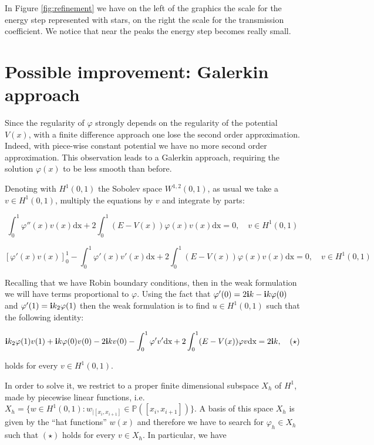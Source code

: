 \documentclass[12pt,a4paper,onecolumn]{article}
\theoremstyle{definition}
\theoremstyle{plain}
\newcommand{\var}{\varphi}
\begin{document}
In Figure \ref {fig:refinement} we have on the left of the graphics the scale for the energy step represented with stars, on the right the scale for the transmission coefficient. We notice that near the peaks the energy step becomes really small.




\section{Possible improvement:  Galerkin approach}


Since the regularity of $\var$ strongly depends on the regularity of the potential $V(x)$, with a finite difference approach one lose the second order approximation. Indeed, with piece-wise constant potential we have no more second order approximation. This observation leads to a Galerkin approach, requiring the solution $\var(x)$ to be less smooth than before. 

Denoting with $H^1(0,1)$ the Sobolev space $W^{1,2}(0,1)$, as usual we take a $v \in H^1(0,1)$, multiply the equations by $v$ and integrate by parts:


\[
\int_{0}^{1} \var ''(x) v(x)  \text{dx} + 2 \int_0^1 (E-V(x))\var (x) v(x) \text{dx} =0, \quad v \in H^1(0,1)
\]



\[
[\var '(x) v(x)]_{0}^{1} - \int_{0}^{1} \var '(x) v'(x)  \text{dx}+ 2 \int_0^1 (E-V(x))\var (x) v(x) \text{dx} =0, \quad v \in H^1(0,1)
\]

Recalling that we have Robin boundary conditions, then in the weak formulation we will have terms proportional to $\var $. Using the fact that $\var'(0)=2 \bold{i} k - \bold{i} k \var(0)$ and $\var'(1)=\bold{i}k_2 \var(1)$ then the weak formulation is to find $u \in H^1(0,1)$ such that the following identity:

\[ 
\bold{i} k_2 \var(1)v(1) + \bold{i} k \var(0) v(0) -2 \bold{i}k v(0) - \int_0^1 \var' v' \text{dx} + 2 \int_0^1(E-V(x)) \var v \text{dx} = 2 \bold{i}k, 	\quad (\star)
\]

holds for every $v \in H^1(0,1)$.

In order to solve it, we restrict to a proper finite dimensional subspace $X_h$ of $H^1$, made by piecewise linear functions, i.e. $X_h= \{ w \in H^1(0,1): w_{|[x_i,x_{i+1}]} \in \mathbb{P}([x_i,x_{i+1}])\}$. A basis of this space $X_h$ is given by the ``hat functions'' $w(x)$ and therefore we have to search for $\var_h \in X_h$ such that $(\star)$ holds for every $v \in X_h$. In particular, we have
\end{document}
